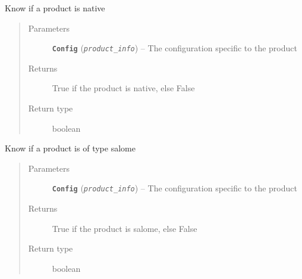 \documentclass[a4paper,10pt,english]{sphinxmanual}
\begin{document}
\begin{fulllineitems}
\label{commands/apidoc/src:src.product.product_is_native}
Know if a product is native
\begin{quote}\begin{description}
\item[{Parameters}] \leavevmode
\textbf{\texttt{Config}} (\emph{\texttt{product\_info}}) -- The configuration specific to 
the product

\item[{Returns}] \leavevmode
True if the product is native, else False

\item[{Return type}] \leavevmode
boolean

\end{description}\end{quote}

\end{fulllineitems}


\begin{fulllineitems}
\label{commands/apidoc/src:src.product.product_is_salome}
Know if a product is of type salome
\begin{quote}\begin{description}
\item[{Parameters}] \leavevmode
\textbf{\texttt{Config}} (\emph{\texttt{product\_info}}) -- The configuration specific to 
the product

\item[{Returns}] \leavevmode
True if the product is salome, else False

\item[{Return type}] \leavevmode
boolean

\end{description}\end{quote}

\end{fulllineitems}

\end{document}
